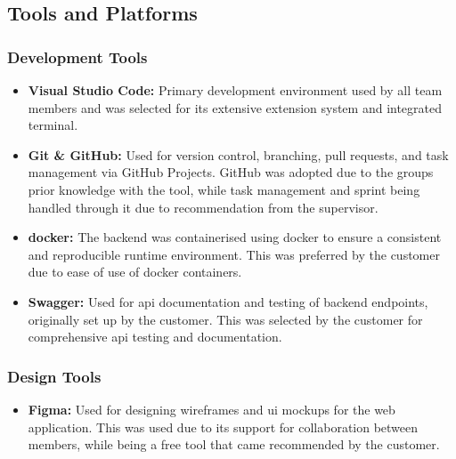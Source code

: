 
\subsection{Tools and Platforms}
\subsubsection{Development Tools}
\begin{itemize}
\item \textbf{Visual Studio Code:} Primary development environment used by all team members and was selected for its extensive extension system and integrated terminal.
\item \textbf{Git \& GitHub:} Used for version control, branching, pull requests, and task management via GitHub Projects. GitHub was adopted due to the groups prior knowledge with the tool, while task management and sprint being handled through it due to recommendation from the supervisor.
\item \textbf{\gls{docker}:} The backend was containerised using \gls{docker} to ensure a consistent and reproducible runtime environment. This was preferred by the customer due to ease of use of \gls{docker} containers.
\item \textbf{Swagger:} Used for \acrshort{api} documentation and testing of backend endpoints, originally set up by the customer. This was selected by the customer for comprehensive \acrshort{api} testing and documentation.
\end{itemize}

\subsubsection{Design Tools}
\begin{itemize}
\item \textbf{Figma:} Used for designing wireframes and \acrshort{ui} mockups for the web application. This was used due to its support for collaboration between members, while being a free tool that came recommended by the customer. 
\end{itemize}

